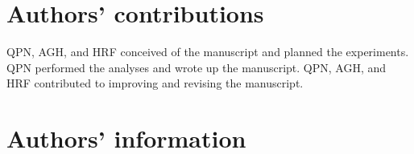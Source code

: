 \documentclass{bmcart}
\begin{document}
\begin{backmatter}
\section*{Authors' contributions}
QPN, AGH, and HRF conceived of the manuscript and planned the experiments. QPN performed the analyses and wrote up the manuscript. QPN, AGH, and HRF contributed to improving and revising the manuscript.  

\section*{Authors' information}%






\end{backmatter}
\end{document}
